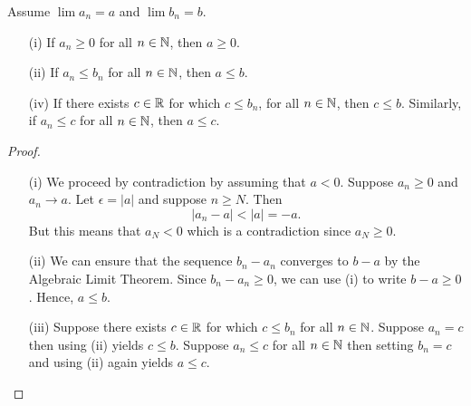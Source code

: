 \begin{theorem} 
    Assume \( \lim a_n  = a\) and \( \lim b_n =  b\).
    \begin{enumerate}
        \item[(i)] If \( a_n \geq 0 \) for all \( n \in \mathbb{N} \), then \( a \geq 0\).
        \item[(ii)] If \( a_n \leq b_n\) for all \( n \in \mathbb{N} \), then \( a \leq b \).
        \item[(iv)] If there exists \( c \in \mathbb{R} \) for which \( c \leq b_n\), for all \( n \in \mathbb{N} \), then 
        \( c \leq b \). Similarly, if \( a_n \leq c \) for all \( n \in \mathbb{N} \), then \( a \leq c\).
    \end{enumerate}
    \end{theorem}%
\begin{proof}
\begin{enumerate}
    \item[(i)] 
We proceed by contradiction by assuming that \( a < 0 \). Suppose \( a_n \geq 0 \) and \( a_n \to a \). Let \( \epsilon  = | a |\) and suppose \( n \geq N \). Then
\[ | a_n - a | < | a | = -a.\]
But this means that \( a_N < 0\) which is a contradiction since \( a_N \geq 0\).
    \item[(ii)]
        We can ensure that the sequence \( b_n - a_n\) converges to \( b - a\) by the Algebraic Limit Theorem. Since \( b_n - a_n \geq 0\), we can use (i) to write \( b - a \geq 0\). Hence, \( a \leq b\).
    \item[(iii)]
            Suppose there exists \( c \in \mathbb{R}  \) for which \( c \leq b_n\) for all \( n \in \mathbb{N} \). Suppose \( a_n  = c \) then using (ii) yields \( c \leq b\). Suppose \( a_n \leq c\) for all \( n \in \mathbb{N} \) then setting \( b_n = c \) and using (ii) again yields \( a \leq c\).
\end{enumerate}
\end{proof}%







